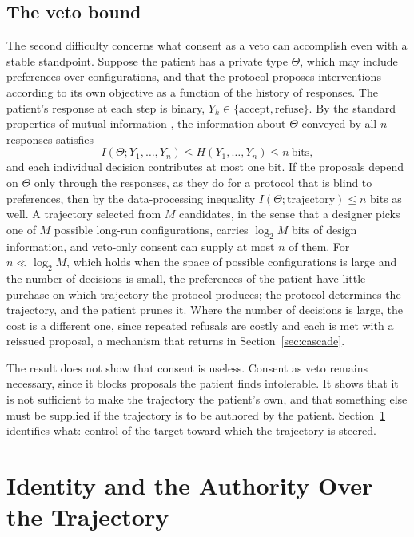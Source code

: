 \documentclass[11pt]{article}
\theoremstyle{plain}
\theoremstyle{definition}
\theoremstyle{remark}
\begin{document}
\subsection{The veto bound}

The second difficulty concerns what consent as a veto can accomplish even with a stable standpoint. Suppose the patient has a private type $\Theta$, which may include preferences over configurations, and that the protocol proposes interventions according to its own objective as a function of the history of responses. The patient's response at each step is binary, $Y_k\in\{\text{accept},\text{refuse}\}$. By the standard properties of mutual information \cite{cover2006}, the information about $\Theta$ conveyed by all $n$ responses satisfies
\begin{equation}\label{eq:veto}
I(\Theta;Y_1,\dots,Y_n)\le H(Y_1,\dots,Y_n)\le n\ \text{bits},
\end{equation}
and each individual decision contributes at most one bit. If the proposals depend on $\Theta$ only through the responses, as they do for a protocol that is blind to preferences, then by the data-processing inequality $I(\Theta;\text{trajectory})\le n$ bits as well. A trajectory selected from $M$ candidates, in the sense that a designer picks one of $M$ possible long-run configurations, carries $\log_2M$ bits of design information, and veto-only consent can supply at most $n$ of them. For $n\ll\log_2M$, which holds when the space of possible configurations is large and the number of decisions is small, the preferences of the patient have little purchase on which trajectory the protocol produces; the protocol determines the trajectory, and the patient prunes it. Where the number of decisions is large, the cost is a different one, since repeated refusals are costly and each is met with a reissued proposal, a mechanism that returns in Section~\ref{sec:cascade}.

The result does not show that consent is useless. Consent as veto remains necessary, since it blocks proposals the patient finds intolerable. It shows that it is not sufficient to make the trajectory the patient's own, and that something else must be supplied if the trajectory is to be authored by the patient. Section~\ref{sec:identity} identifies what: control of the target toward which the trajectory is steered.

\section{Identity and the Authority Over the Trajectory}\label{sec:identity}
\end{document}
